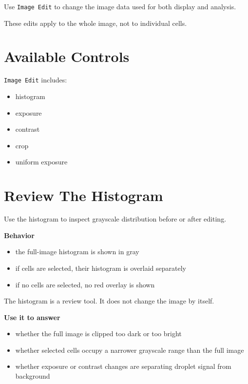 \documentclass[
  9pt,
  letterpaper,
  oneside,
  open=any,
  DIV=15,
  parskip=half-,
  headings=big,
  numbers=noenddot
]{scrbook}
\newcommand{\manuallead}[1]{%
  \vspace{0.15em}%
  {\sffamily\bfseries\color{ManualBlue}#1}\par\nobreak\vspace{0.05em}%
}
\begin{document}
Use \texttt{Image Edit} to change the image data used for both display and analysis.


These edits apply to the whole image, not to individual cells.


\section{Available Controls}

\texttt{Image Edit} includes:


\begin{itemize}[leftmargin=*,itemsep=0.35em,topsep=0.4em]
\item histogram
\item exposure
\item contrast
\item crop
\item uniform exposure
\end{itemize}

\section{Review The Histogram}

Use the histogram to inspect grayscale distribution before or after editing.


\manuallead{Behavior}

\begin{itemize}[leftmargin=*,itemsep=0.35em,topsep=0.4em]
\item the full-image histogram is shown in gray
\item if cells are selected, their histogram is overlaid separately
\item if no cells are selected, no red overlay is shown
\end{itemize}

The histogram is a review tool. It does not change the image by itself.


\manuallead{Use it to answer}

\begin{itemize}[leftmargin=*,itemsep=0.35em,topsep=0.4em]
\item whether the full image is clipped too dark or too bright
\item whether selected cells occupy a narrower grayscale range than the full image
\item whether exposure or contrast changes are separating droplet signal from background
\end{itemize}
\end{document}
